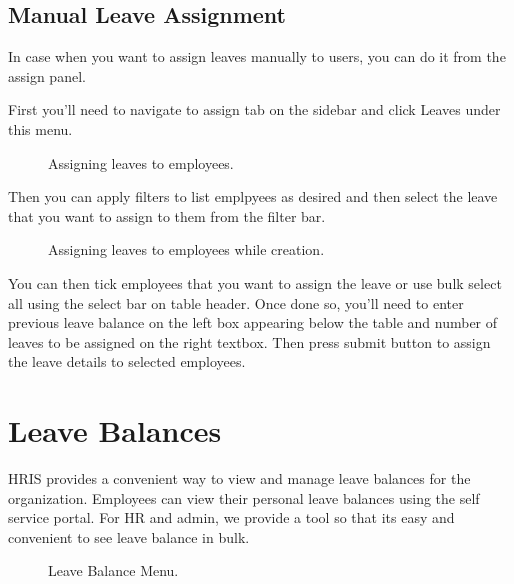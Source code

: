 \documentclass[letterpaper,10pt,english]{sphinxmanual}
\begin{document}
\subsection{Manual Leave Assignment}
\label{\detokenize{leave-holiday/leave-configuration:manual-leave-assignment}}
In case when you want to assign leaves manually to users, you can do it from the assign panel.

First you’ll need to navigate to assign tab on the sidebar and click Leaves under this menu.

\begin{figure}[htbp]
\centering
\capstart

\noindent{}
\caption{Assigning leaves to employees.}\label{\detokenize{leave-holiday/leave-configuration:id4}}\end{figure}

Then you can apply filters to list emplpyees as desired and then select the leave that you want to assign to them from the filter bar.

\begin{figure}[htbp]
\centering
\capstart

\noindent{}
\caption{Assigning leaves to employees while creation.}\label{\detokenize{leave-holiday/leave-configuration:id5}}\end{figure}

You can then tick employees that you want to assign the leave or use bulk select all using the select bar on table header. Once done so, you’ll need to enter previous leave balance on the left box appearing below the table and number of leaves to be assigned on the right textbox. Then press submit button to assign the leave details to selected employees.


\section{Leave Balances}
\label{\detokenize{leave-holiday/leave-balance::doc}}\label{\detokenize{leave-holiday/leave-balance:leave-balances}}
HRIS provides a convenient way to view and manage leave balances for the organization. Employees can view their personal leave balances using the self service portal. For HR and admin, we provide a tool so that its easy and convenient to see leave balance in bulk.

\begin{figure}[htbp]
\centering
\capstart

\noindent{}
\caption{Leave Balance Menu.}\label{\detokenize{leave-holiday/leave-balance:id1}}\end{figure}
\end{document}
